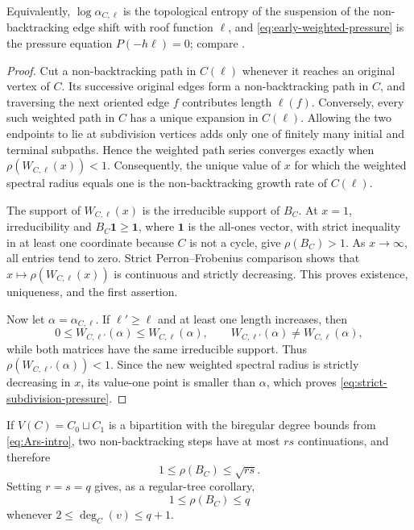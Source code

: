 \documentclass[11pt]{amsart}
\theoremstyle{plain}
\theoremstyle{definition}
\theoremstyle{remark}
\begin{document}
Equivalently, \(\log\alpha_{C,\ell}\) is the topological entropy of the
suspension of the non-backtracking edge shift with roof function \(\ell\),
and \eqref{eq:early-weighted-pressure} is the pressure equation
\(P(-h\ell)=0\); compare \cite{Lim2008}.

\begin{proof}
Cut a non-backtracking path in \(C(\ell)\) whenever it reaches an original
vertex of \(C\).  Its successive original edges form a non-backtracking path
in \(C\), and traversing the next oriented edge \(f\) contributes length
\(\ell(f)\).  Conversely, every such weighted path in \(C\) has a unique
expansion in \(C(\ell)\).  Allowing the two endpoints to lie at subdivision
vertices adds only one of finitely many initial and terminal subpaths.  Hence
the weighted path series converges exactly when
\(\rho(W_{C,\ell}(x))<1\).  Consequently, the unique value of \(x\) for which
the weighted spectral radius equals one is the non-backtracking growth rate
of \(C(\ell)\).

The support of \(W_{C,\ell}(x)\) is the irreducible support of \(B_C\).
At \(x=1\), irreducibility and
\(B_C\mathbf 1\geq\mathbf 1\), where \(\mathbf1\) is the all-ones vector,
with strict inequality in at least one
coordinate because \(C\) is not a cycle, give \(\rho(B_C)>1\).  As
\(x\to\infty\), all entries tend to zero.  Strict Perron--Frobenius
comparison shows that
\(x\mapsto\rho(W_{C,\ell}(x))\) is continuous and strictly decreasing.
This proves existence, uniqueness, and the first assertion.

Now let \(\alpha=\alpha_{C,\ell}\).  If \(\ell'\geq\ell\) and at least one
length increases, then
\[
  0\leq W_{C,\ell'}(\alpha)
  \leq W_{C,\ell}(\alpha),
  \qquad
  W_{C,\ell'}(\alpha)\neq W_{C,\ell}(\alpha),
\]
while both matrices have the same irreducible support.  Thus
\(\rho(W_{C,\ell'}(\alpha))<1\).  Since the new weighted spectral radius is
strictly decreasing in \(x\), its value-one point is smaller than \(\alpha\),
which proves \eqref{eq:strict-subdivision-pressure}.
\end{proof}

If \(V(C)=C_0\sqcup C_1\) is a bipartition with the biregular degree bounds from
\eqref{eq:Ars-intro}, two non-backtracking steps have at most \(rs\)
continuations, and therefore
\begin{equation}\label{eq:biregular-rho-bound}
  1\leq\rho(B_C)\leq\sqrt{rs}.
\end{equation}
Setting \(r=s=q\) gives, as a regular-tree corollary,
\begin{equation}\label{eq:regular-rho-bound}
  1\leq\rho(B_C)\leq q
\end{equation}
whenever \(2\leq\deg_C(v)\leq q+1\).
\end{document}
